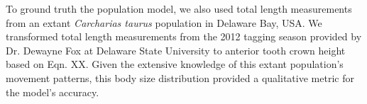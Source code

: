 \documentclass[]{rsos}%
\begin{document}
To ground truth the population model, we also used total length measurements from an extant \emph{Carcharias taurus} population in Delaware Bay, USA. 
We transformed total length measurements from the 2012 tagging season provided by Dr. Dewayne Fox at  Delaware State University to anterior tooth crown height based on Eqn. XX. 
Given the extensive knowledge of this extant population's movement patterns, this body size distribution provided a qualitative metric for the model's accuracy.






\end{document}
